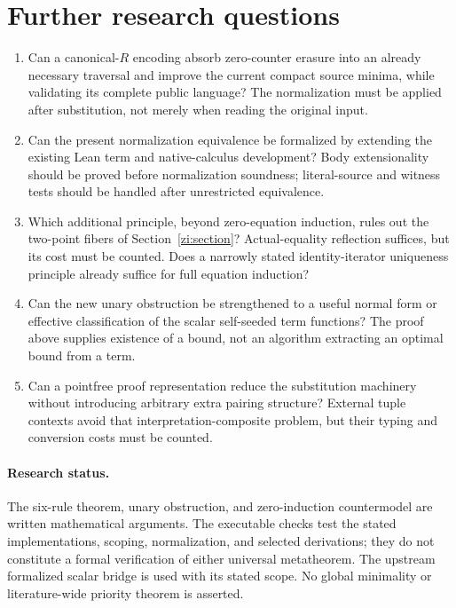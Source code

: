 \section{Further research questions}

\begin{enumerate}[leftmargin=*]
\item Can a canonical-$R$ encoding absorb zero-counter erasure into an
already necessary traversal and improve the current compact source minima,
while validating its complete public language? The normalization must be
applied after substitution, not merely when reading the original input.
\item Can the present normalization equivalence be formalized by extending
the existing Lean term and native-calculus development? Body extensionality
should be proved before normalization soundness; literal-source and
witness tests should be handled after unrestricted equivalence.
\item Which additional principle, beyond zero-equation induction, rules out
the two-point fibers of Section~\ref{zi:section}? Actual-equality reflection
suffices, but its cost must be counted. Does a narrowly stated
identity-iterator uniqueness principle already suffice for full equation
induction?
\item Can the new unary obstruction be strengthened to a useful normal
form or effective classification of the scalar self-seeded term functions?
The proof above supplies existence of a bound, not an algorithm extracting
an optimal bound from a term.
\item Can a pointfree proof representation reduce the substitution
machinery without introducing arbitrary extra pairing structure? External
tuple contexts avoid that interpretation-composite problem, but their
typing and conversion costs must be counted.
\end{enumerate}

\paragraph{Research status.}
The six-rule theorem, unary obstruction, and zero-induction countermodel are written mathematical
arguments. The executable checks test the stated implementations, scoping,
normalization, and selected derivations; they do not constitute a formal
verification of either universal metatheorem. The upstream formalized
scalar bridge is used with its stated scope. No global minimality or
literature-wide priority theorem is asserted.

